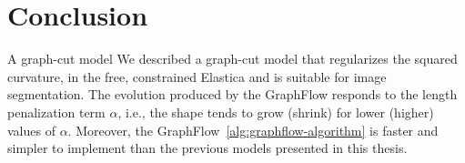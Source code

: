 \section{Conclusion}
A graph-cut model  We described a graph-cut model that regularizes the squared curvature, in the free, constrained Elastica and is suitable for image segmentation. The evolution produced by the GraphFlow responds to the length penalization term $\alpha$, i.e., the shape tends to grow (shrink) for lower (higher) values of $\alpha$.  Moreover, the GraphFlow~\cref{alg:graphflow-algorithm} is faster and simpler to implement than the previous models presented in this thesis.